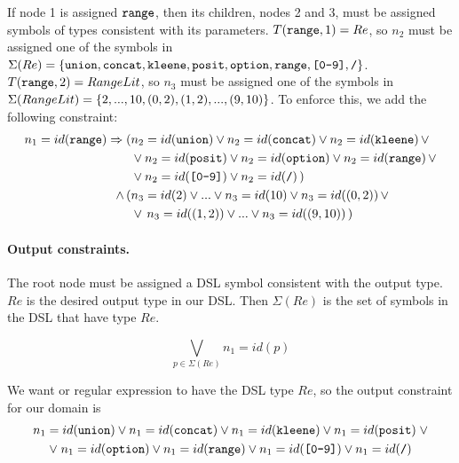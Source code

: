 \begin{example}\label{ex:children-constraints}
If node 1 is assigned \(\texttt{range}\), then its children, nodes 2 and 3, must be assigned symbols of types consistent with its parameters. \({T(\texttt{range}, 1) = Re}\), so \(n_2\) must be assigned one of the symbols in
\(\Sigma(Re)=\{\texttt{union}, \texttt{concat},\allowbreak \texttt{kleene},\allowbreak \texttt{posit},\allowbreak \texttt{option},\allowbreak \texttt{range}, \texttt{[0-9]}, \texttt{/}\}\).
\(T(\texttt{range}, 2) = RangeLit\), so \(n_3\) must be assigned one of the symbols in \(\Sigma(RangeLit) = \{2,\allowbreak ...,\allowbreak 10,\allowbreak (0,2),\allowbreak (1,2),\allowbreak ... ,\allowbreak (9,10)\}\).
To enforce this, we add the following constraint:
\begin{align*}
    n_1=id(\texttt{range}) \Rightarrow (&n_2=id(\texttt{union}) \lor n_2=id(\texttt{concat}) \lor n_2=id(\texttt{kleene}) \,\lor\\
    &\lor n_2=id(\texttt{posit}) \lor n_2=id(\texttt{option}) \lor n_2=id(\texttt{range}) \,\lor\\
    &\lor n_2=id(\texttt{[0-9]}) \lor n_2=id(\texttt{/})\,) \\
    \land \, (&n_3=id(2) \lor ... \lor n_3=id(10) \lor n_3=id((0,2)) \,\lor \\
    &\lor\, n_3=id((1,2)) \lor ... \lor  n_3=id((9,10))\,)
\end{align*}
\end{example}

\paragraph{Output constraints.}  
The root node must be assigned a DSL symbol consistent with the output type. \(Re\) is the desired output type in our DSL. Then \(\Sigma(Re)\) is the set of symbols in the DSL that have type \(Re\).

\begin{equation}
    \bigvee_{p\in \Sigma(Re)} n_1 = id(p)
\end{equation}


\begin{example}
We want or regular expression to have the DSL type \(Re\), so the output constraint for our domain is
\begin{gather*}
    n_1 = id(\texttt{union}) \lor n_1 = id(\texttt{concat}) \lor n_1 = id(\texttt{kleene}) \lor n_1 = id(\texttt{posit}) \;\lor \\
    \lor\; n_1 = id(\texttt{option}) \lor n_1 = id(\texttt{range}) \lor n_1 = id(\texttt{[0-9]}) \lor n_1 = id(\texttt{/})
\end{gather*}
\end{example}

